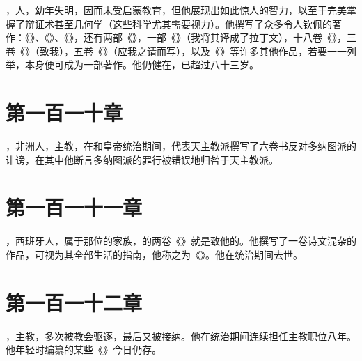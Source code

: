 ，人，幼年失明，因而未受启蒙教育，但他展现出如此惊人的智力，以至于完美掌握了辩证术甚至几何学（这些科学尤其需要视力）。他撰写了众多令人钦佩的著作：《》、《》、《》，还有两部《》，一部《》（我将其译成了拉丁文），十八卷《》，三卷《》（致我），五卷《》（应我之请而写），以及《》等许多其他作品，若要一一列举，本身便可成为一部著作。他仍健在，已超过八十三岁。\par


\section{第一百一十章}

，非洲人，主教，在和皇帝统治期间，代表天主教派撰写了六卷书反对多纳图派的诽谤，在其中他断言多纳图派的罪行被错误地归咎于天主教派。\par


\section{第一百一十一章}

，西班牙人，属于那位的家族，的两卷《》就是致他的。他撰写了一卷诗文混杂的作品，可视为其全部生活的指南，他称之为《》。他在统治期间去世。\par


\section{第一百一十二章}

，主教，多次被教会驱逐，最后又被接纳。他在统治期间连续担任主教职位八年。他年轻时编纂的某些《》今日仍存。\par


